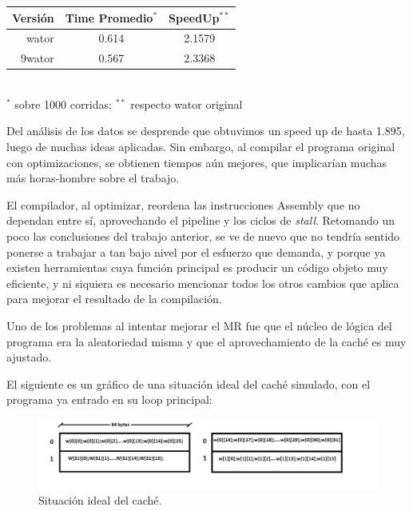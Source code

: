 \documentclass[a4paper,10pt]{article}
\begin{document}
\begin{center}
  \begin{tabular}{| r | c | c |}
    \hline
    Versi\'on	&   Time Promedio$^*$  & 	SpeedUp$^{**}$ 	\\ \hline \hline
    wator	&	0.614		&	2.1579		\\ \hline
    9wator	&	0.567		&	2.3368		\\ \hline
  \end{tabular}
   \\
   \small{$^*$ sobre 1000 corridas; $^{**}$ respecto wator original} \\ 
   
  \bigskip
\end{center}   

    Del an\'alisis de los datos se desprende que obtuvimos un speed up de hasta 1.895, luego de muchas ideas aplicadas. Sin embargo, al compilar el programa original con optimizaciones, se obtienen tiempos a\'un mejores, que implicar\'ian muchas m\'as horas-hombre sobre el trabajo.

    El compilador, al optimizar, reordena las instrucciones Assembly que no dependan entre s\'i, aprovechando el pipeline y los ciclos de \textit{stall}. Retomando un poco las conclusiones del trabajo anterior, se ve de nuevo que no tendr\'ia sentido ponerse a trabajar a tan bajo nivel por el esfuerzo que demanda, y porque ya existen herramientas cuya funci\'on principal es producir un c\'odigo objeto muy eficiente, y ni siquiera es necesario mencionar todos los otros cambios que aplica para mejorar el resultado de la compilaci\'on.

    Uno de los problemas al intentar mejorar el MR fue que el n\'ucleo de l\'ogica del programa era la aleatoriedad misma y que el aprovechamiento de la cach\'e es muy ajustado.

El siguiente es un gr\'afico de una situaci\'on ideal del cach\'e simulado, con el programa ya entrado en su loop principal:

\begin{figure}[!htp]
\begin{center}
\includegraphics[width=1\textwidth]{Cache.png}
\end{center}
\caption{Situaci\'on ideal del cach\'e.} \label{fig001234}
\end{figure}
\end{document}
